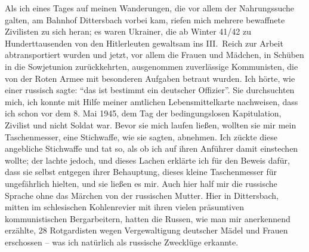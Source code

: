 \documentclass[a5paper,pagesize,10pt,twoside=true]{scrbook}
\renewcommand{\marginpar}[2][]{}
\begin{document}
Als ich eines Tages auf meinen Wanderungen, die vor allem der Nahrungssuche galten, am Bahnhof Dittersbach vorbei kam, riefen mich mehrere bewaffnete Zivilisten zu sich heran; es waren Ukrainer, die ab Winter 41/42 zu Hunderttausenden von den Hitlerleuten gewaltsam ins \mbox{III. Reich} zur Arbeit abtransportiert wurden \marginpar{84} und jetzt, vor allem die Frauen und Mädchen, in Schüben in die Sowjetunion zurückkehrten, ausgenommen zuverlässige Kommunisten, die von der Roten Armee mit besonderen Aufgaben betraut wurden. Ich hörte, wie einer russisch sagte: \enquote{das ist bestimmt ein deutscher Offizier}. Sie durchsuchten mich, ich konnte mit Hilfe meiner amtlichen Lebensmittelkarte nachweisen, dass ich schon vor dem 8. Mai 1945, dem Tag der bedingungslosen Kapitulation, Zivilist und nicht Soldat war. Bevor sie mich laufen ließen, wollten sie mir mein Taschenmesser, eine Stichwaffe, wie sie sagten, abnehmen. Ich zückte diese angebliche Stichwaffe und tat so, als ob ich auf ihren Anführer damit einstechen wollte; der lachte jedoch, und dieses Lachen erklärte ich für den Beweis dafür, dass sie selbst entgegen ihrer Behauptung, dieses kleine Taschenmesser für ungefährlich hielten, und sie ließen es mir. Auch hier half mir die russische Sprache ohne das Märchen von der russischen Mutter. Hier in Dittersbach, mitten im schlesischen Kohlenrevier mit ihren vielen präsumtiven kommunistischen Bergarbeitern, hatten die Russen, wie man mir anerkennend erzählte, 28 Rotgardisten wegen Vergewaltigung deutscher Mädel und Frauen erschossen -- was ich natürlich als russische Zwecklüge erkannte.
\end{document}
